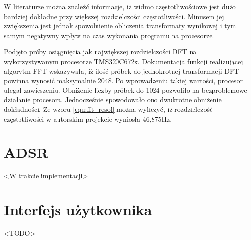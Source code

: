 W literaturze można znaleźć informacje, iż widmo częstotliwościowe jest dużo bardziej dokładne przy większej rozdzielczości częstotliwości. Minusem jej zwiększenia jest jednak spowolnienie obliczenia transformaty wynikowej i tym samym negatywny wpływ na czas wykonania programu na procesorze.

Podjęto próby osiągnięcia jak największej rozdzielczości DFT na wykorzystywanym procesorze TMS320C672x. Dokumentacja funkcji realizującej algorytm FFT wskazywała, iż ilość próbek do jednokrotnej transformacji DFT powinna wynosić maksymalnie 2048. Po wprowadzeniu takiej wartości, procesor ulegał zawieszeniu. Obniżenie liczby próbek do 1024 pozwoliło na bezproblemowe działanie procesora. Jednocześnie spowodowało ono dwukrotne obniżenie dokładności. Ze wzoru \ref{equ:fft_resol} można wyliczyć, iż rozdzielczość częstotliwości w autorskim projekcie wyniosła 46,875Hz.


\section{ADSR}
<W trakcie implementacji>


\section{Interfejs użytkownika}
<TODO>